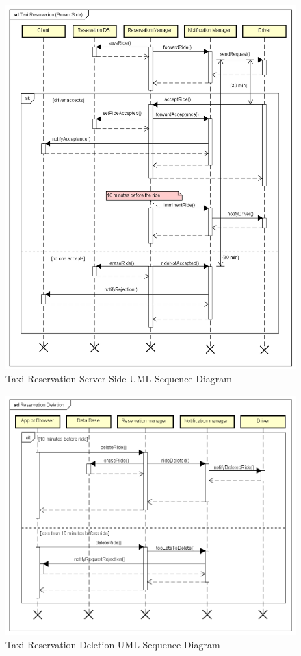 \documentclass[a4paper]{article}
\begin{document}
\begin{figure}[H]
\includegraphics[width=\sequenceWidth]{Sequence-TaxiReservationServerSide}
\centering
\caption{Taxi Reservation Server Side UML Sequence Diagram}
\label{fig:sequencereservationserverside}
\end{figure}

\begin{figure}[H]
\includegraphics[width=\sequenceWidth]{Sequence-TaxiReservationDeletion}
\centering
\caption{Taxi Reservation Deletion UML Sequence Diagram}
\label{fig:sequencereservationdeletion}
\end{figure}
\end{document}
